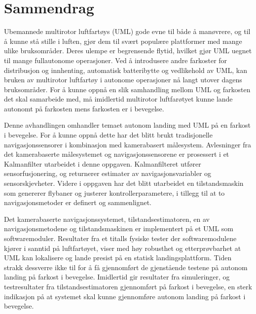\chapter{Sammendrag}\label{cha:sammendrag}
Ubemannede multirotor luftfartøys (UML) gode evne til både å manøvrere, og til å kunne stå stille i luften, gjør dem til svært populære plattformer med mange ulike bruksområder. Deres ulempe er begrensende flytid, hvilket gjør UML uegnet til mange fullautonome operasjoner. Ved å introdusere andre farkoster for distribusjon og innhenting, automatisk batteribytte og vedlikehold av UML, kan bruken av multirotor luftfartøy i autonome operasjoner nå langt utover dagens bruksområder. For å kunne oppnå en slik samhandling mellom UML og farkosten det skal samarbeide med, må imidlertid multirotor luftfarøtyet kunne lande autonomt på farkosten mens farkosten er i bevegelse. 

Denne avhandlingen omhandler temaet autonom landing med UML på en farkost i bevegelse. For å kunne oppnå dette har det blitt brukt tradisjonelle navigasjonssensorer i kombinasjon med kamerabasert målesystem. Avlesninger fra det kamerabaserte målesystemet og navigasjonssensorene er prosessert i et Kalmanfilter utarbeidet i denne oppgaven. Kalmanfilteret utfører sensorfusjonering, og returnerer estimater av navigasjonsvariabler og sensorskjevheter. Videre i oppgaven har det blitt utarbeidet en tilstandsmaskin som genererer flybaner og justerer kontrollerparametere, i tillegg til at to navigasjonsmetoder er definert og sammenlignet.

Det kamerabaserte navigasjonssystemet, tilstandsestimatoren, en av navigasjonsmetodene og tilstandsmaskinen er implementert på et UML som softwaremoduler. Resultater fra et titalls fysiske tester der softwaremodulene kjører i sanntid på luftfartøyet, viser med høy robusthet og etterprøvbarhet at UML kan lokalisere og lande presist på en statisk landingsplattform. Tiden strakk dessverre ikke til for å få gjennomført de gjenstående testene på autonom landing på farkost i bevegelse. Imidlertid gir resultater fra simuleringer, og testresultater fra tilstandsestimatoren gjennomført på farkost i bevegelse, en sterk indikasjon på at systemet skal kunne gjennomføre autonom landing på farkost i bevegelse. 
